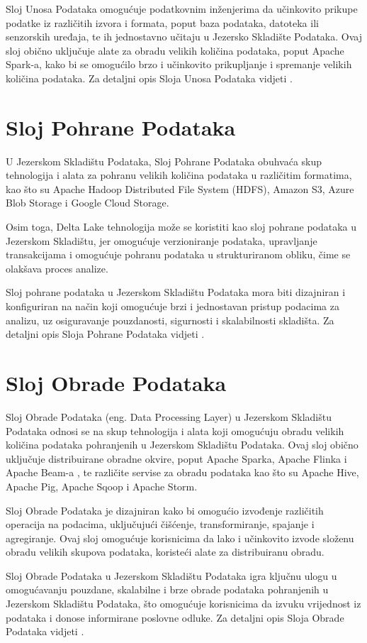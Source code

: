 Sloj Unosa Podataka omogućuje podatkovnim inženjerima da učinkovito prikupe
podatke iz različitih izvora i formata, poput baza podataka, datoteka ili
senzorskih uređaja, te ih jednostavno učitaju u Jezersko Skladište Podataka.
Ovaj sloj obično uključuje alate za obradu velikih količina podataka, poput
Apache Spark-a, kako bi se omogućilo brzo i učinkovito prikupljanje i spremanje
velikih količina podataka. Za detaljni opis Sloja Unosa Podataka vidjeti
\cite[c.2.2.1]{datalakehouse2022}.

\section{Sloj Pohrane Podataka} \label{section:sloj_pohrane_podataka}
U Jezerskom Skladištu Podataka, Sloj Pohrane Podataka obuhvaća skup tehnologija
i alata za pohranu velikih količina podataka u različitim formatima, kao što su
Apache Hadoop Distributed File System (HDFS), Amazon S3, Azure Blob Storage i
Google Cloud Storage.

Osim toga, Delta Lake tehnologija može se koristiti kao sloj pohrane podataka u
Jezerskom Skladištu, jer omogućuje verzioniranje podataka, upravljanje
transakcijama i omogućuje pohranu podataka u strukturiranom obliku, čime se
olakšava proces analize.

Sloj pohrane podataka u Jezerskom Skladištu Podataka mora biti dizajniran i
konfiguriran na način koji omogućuje brzi i jednostavan pristup podacima za
analizu, uz osiguravanje pouzdanosti, sigurnosti i skalabilnosti skladišta. Za
detaljni opis Sloja Pohrane Podataka vidjeti \cite[c.2.2.2]{datalakehouse2022}.

\section{Sloj Obrade Podataka} \label{section:sloj_obrade_podataka}
Sloj Obrade Podataka (eng. Data Processing Layer) u Jezerskom Skladištu Podataka
odnosi se na skup tehnologija i alata koji omogućuju obradu velikih količina
podataka pohranjenih u Jezerskom Skladištu Podataka. Ovaj sloj obično uključuje
distribuirane obradne okvire, poput Apache Sparka, Apache Flinka i Apache Beam-a
, te različite servise za obradu podataka kao što su Apache Hive, Apache Pig,
Apache Sqoop i Apache Storm.

Sloj Obrade Podataka je dizajniran kako bi omogućio izvođenje različitih
operacija na podacima, uključujući čišćenje, transformiranje, spajanje i
agregiranje. Ovaj sloj omogućuje korisnicima da lako i učinkovito izvode složenu
obradu velikih skupova podataka, koristeći alate za distribuiranu obradu.

Sloj Obrade Podataka u Jezerskom Skladištu Podataka igra ključnu ulogu u
omogućavanju pouzdane, skalabilne i brze obrade podataka pohranjenih u Jezerskom
Skladištu Podataka, što omogućuje korisnicima da izvuku vrijednost iz podataka i
donose informirane poslovne odluke. Za detaljni opis Sloja Obrade Podataka
vidjeti \cite[c.2.2.3]{datalakehouse2022}.